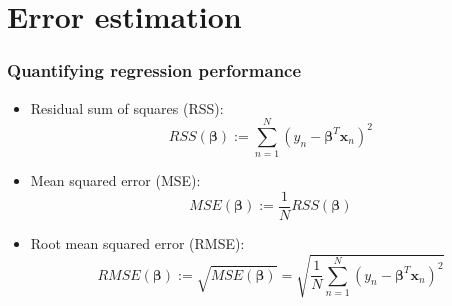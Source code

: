 \documentclass[smaller]{beamer}
\newcommand{\?}{\stackrel{?}{=}}
\newcommand{\fr}{\frac}
\begin{document}
\section{Error estimation}

\begin{frame}
  \frametitle{Quantifying regression performance}

  \begin{itemize}
  \item Residual sum of squares (RSS):\pause
    \begin{equation}
      RSS(\bm\beta) := \sum_{n=1}^N(y_n - \bm\beta^{T}\bm x_n)^2
    \end{equation}
    \pause
  \item Mean squared error (MSE): \pause
    \begin{equation}
      MSE(\bm\beta) := \fr1N RSS(\bm\beta)
    \end{equation}
    \pause

  \item Root mean squared error (RMSE): \pause
    \begin{equation}
      RMSE(\bm\beta) := \sqrt{MSE(\bm\beta)} = \sqrt{\fr1N  \sum_{n=1}^N(y_n - \bm\beta^{T}\bm x_n)^2}
    \end{equation}
  \end{itemize}
\end{frame}
\end{document}
